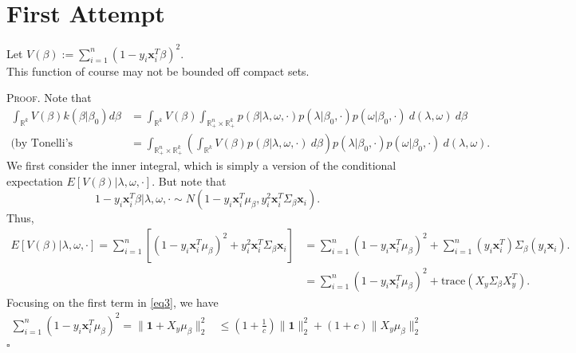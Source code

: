 \documentclass[12pt]{article}
\newcounter{ProofCounter}
\newenvironment{Proof}{\stepcounter{ProofCounter}\textsc{Proof.}}{\hfill$\square$}
\begin{document}
\newpage

\section{First Attempt}

Let $V(\beta) := \sum_{i=1}^{n}(1 - y_i\bm{x}_i^T\beta)^2$. \\

This function of course may not be bounded off compact sets.

\begin{Proof}
  Note that 
  \begin{align}
    \int_{\mathbb{R}^{k}} V(\beta) k(\beta|\beta_0)d\beta & = \int_{\mathbb{R}^{k}}V(\beta) \int_{\mathbb{R}^{n}_+\times \mathbb{R}^{k}_+}
    p(\beta|\lambda,\omega, \cdot)p(\lambda|\beta_0, \cdot)p(\omega|\beta_0, \cdot)\ d(\lambda, \omega)\ d\beta \nonumber \\
    \text{(by Tonelli's Theorem)} \ & = \int_{\mathbb{R}^{n}_+\times\mathbb{R}^{k}_+} \left( \int_{\mathbb{R}^{k}} V(\beta)p(\beta|\lambda, \omega,
    \cdot)\ d\beta \right) p(\lambda|\beta_0,\cdot)p(\omega|\beta_0, \cdot)\ d(\lambda, \omega).
    \label{eq0}
  \end{align}
  We first consider the inner integral, which is simply a version of the conditional expectation $E[V(\beta)|\lambda,\omega,\cdot]$.
  But note that 
  \begin{equation*}
    1 - y_i\bm{x}_i^T\beta | \lambda, \omega, \cdot \sim N\left( 1 - y_i\bm{x}_i^T\mu_{\beta}, y_i^2 \bm{x}_i^T \Sigma_{\beta}\bm{x}_i\right).
    \label{eq2}
  \end{equation*}
  Thus,
  \begin{align}
    E[V(\beta)|\lambda,\omega,\cdot] = \sum_{i=1}^{n}\left[(1 - y_i\bm{x}_i^T\mu_{\beta})^2 + y_i^2 \bm{x}_i^T \Sigma_{\beta} \bm{x}_i\right] & = \sum_{i=1}^{n}
    (1 - y_i\bm{x}_i^T\mu_{\beta})^2 + \sum_{i=1}^{n}(y_i\bm{x}_i^T)\Sigma_{\beta}(y_i \bm{x}_i). \nonumber \\
    & = \sum_{i=1}^{n} (1 - y_i\bm{x}_i^T\mu_{\beta})^2 + \text{trace}(X_{y} \Sigma_{\beta} X_{y}^T).
    \label{eq3}
  \end{align}
  Focusing on the first term in \eqref{eq3}, we have 
  \begin{align}
    \sum_{i=1}^{n}(1 - y_i \bm{x}_i^T \mu_{\beta})^2 = \|\mathbf{1} + X_{y}\mu_{\beta}\|_{2}^{2} 
    & \leq \left(1 + \frac{1}{c}\right) \|\mathbf{1}\|_{2}^{2} + \left( 1 + c \right)\|X_{y}\mu_{\beta}\|_{2}^{2} \nonumber \\

\end{align}
\end{Proof}
\end{document}
